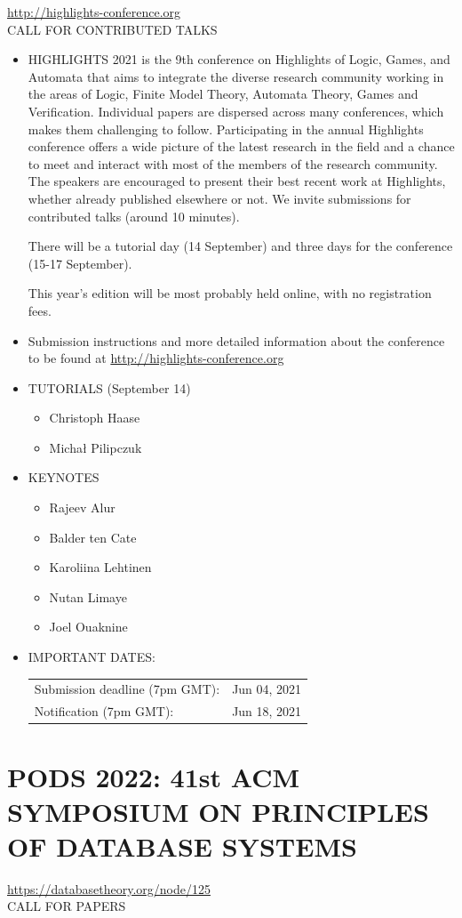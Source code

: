 \documentclass[prodmode,acmtecs]{acmsmall} %
\begin{document}
  \href{http://highlights-conference.org}{http://highlights-conference.org}\\ 
CALL FOR CONTRIBUTED TALKS 

\begin{itemize}\item  HIGHLIGHTS 2021 is the 9th conference on Highlights of Logic, Games, and Automata that aims to integrate the diverse research community working in the areas of Logic, Finite Model Theory, Automata Theory, Games and Verification. Individual papers are dispersed across many conferences, which makes them challenging to follow. Participating in the annual Highlights conference offers a wide picture of the latest research in the field and a chance to meet and interact with most of the members of the research community. The speakers are encouraged to present their best recent work at Highlights, whether already published elsewhere or not. We invite submissions for contributed talks (around 10 minutes). 
 
  There will be a tutorial day (14 September) and three days for the conference (15-17 September).  
 
  This year's edition will be most probably held online, with no registration fees. 
 
\item  Submission instructions and more detailed information about the conference to be found at \href{http://highlights-conference.org}{http://highlights-conference.org} 
 
\item  TUTORIALS (September 14) 
 
\begin{itemize}\item  Christoph Haase
\item  Michał Pilipczuk
\end{itemize} 
\item  KEYNOTES 
 
\begin{itemize}\item  Rajeev Alur
\item  Balder ten Cate
\item  Karoliina Lehtinen
\item  Nutan Limaye
\item  Joel Ouaknine
\end{itemize} 
\item  IMPORTANT DATES: 
 
\begin{tabulary}{\linewidth}{LL}Submission deadline (7pm GMT):  & Jun 04, 2021 \\
Notification (7pm GMT):  & Jun 18, 2021 \\
\end{tabulary}
 
\end{itemize}\section{PODS 2022: 41st ACM SYMPOSIUM ON PRINCIPLES OF DATABASE SYSTEMS}\label{PODS2022}  \href{https://databasetheory.org/node/125}{https://databasetheory.org/node/125}\\ 
CALL FOR PAPERS 
\end{document}
